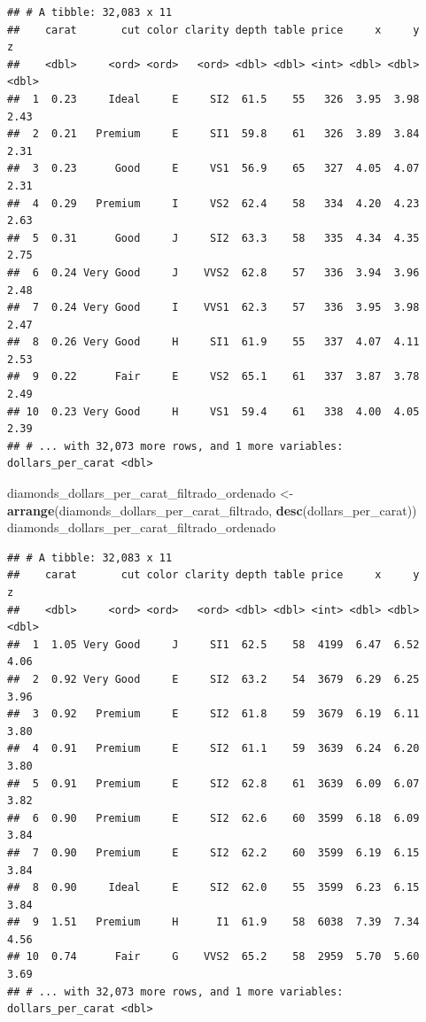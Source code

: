 \documentclass[]{book}
\newenvironment{Shaded}{\begin{snugshade}}{\end{snugshade}}
\newcommand{\KeywordTok}[1]{\textcolor[rgb]{0.13,0.29,0.53}{\textbf{#1}}}
\newcommand{\StringTok}[1]{\textcolor[rgb]{0.31,0.60,0.02}{#1}}
\newcommand{\NormalTok}[1]{#1}
\theoremstyle{definition}
\theoremstyle{definition}
\theoremstyle{definition}
\theoremstyle{remark}
\begin{document}
\begin{verbatim}
## # A tibble: 32,083 x 11
##    carat       cut color clarity depth table price     x     y     z
##    <dbl>     <ord> <ord>   <ord> <dbl> <dbl> <int> <dbl> <dbl> <dbl>
##  1  0.23     Ideal     E     SI2  61.5    55   326  3.95  3.98  2.43
##  2  0.21   Premium     E     SI1  59.8    61   326  3.89  3.84  2.31
##  3  0.23      Good     E     VS1  56.9    65   327  4.05  4.07  2.31
##  4  0.29   Premium     I     VS2  62.4    58   334  4.20  4.23  2.63
##  5  0.31      Good     J     SI2  63.3    58   335  4.34  4.35  2.75
##  6  0.24 Very Good     J    VVS2  62.8    57   336  3.94  3.96  2.48
##  7  0.24 Very Good     I    VVS1  62.3    57   336  3.95  3.98  2.47
##  8  0.26 Very Good     H     SI1  61.9    55   337  4.07  4.11  2.53
##  9  0.22      Fair     E     VS2  65.1    61   337  3.87  3.78  2.49
## 10  0.23 Very Good     H     VS1  59.4    61   338  4.00  4.05  2.39
## # ... with 32,073 more rows, and 1 more variables: dollars_per_carat <dbl>
\end{verbatim}

\begin{Shaded}
\begin{Highlighting}[]
\NormalTok{diamonds_dollars_per_carat_filtrado_ordenado <-}\StringTok{ }\KeywordTok{arrange}\NormalTok{(diamonds_dollars_per_carat_filtrado, }\KeywordTok{desc}\NormalTok{(dollars_per_carat))}
\NormalTok{diamonds_dollars_per_carat_filtrado_ordenado}
\end{Highlighting}
\end{Shaded}

\begin{verbatim}
## # A tibble: 32,083 x 11
##    carat       cut color clarity depth table price     x     y     z
##    <dbl>     <ord> <ord>   <ord> <dbl> <dbl> <int> <dbl> <dbl> <dbl>
##  1  1.05 Very Good     J     SI1  62.5    58  4199  6.47  6.52  4.06
##  2  0.92 Very Good     E     SI2  63.2    54  3679  6.29  6.25  3.96
##  3  0.92   Premium     E     SI2  61.8    59  3679  6.19  6.11  3.80
##  4  0.91   Premium     E     SI2  61.1    59  3639  6.24  6.20  3.80
##  5  0.91   Premium     E     SI2  62.8    61  3639  6.09  6.07  3.82
##  6  0.90   Premium     E     SI2  62.6    60  3599  6.18  6.09  3.84
##  7  0.90   Premium     E     SI2  62.2    60  3599  6.19  6.15  3.84
##  8  0.90     Ideal     E     SI2  62.0    55  3599  6.23  6.15  3.84
##  9  1.51   Premium     H      I1  61.9    58  6038  7.39  7.34  4.56
## 10  0.74      Fair     G    VVS2  65.2    58  2959  5.70  5.60  3.69
## # ... with 32,073 more rows, and 1 more variables: dollars_per_carat <dbl>
\end{verbatim}
\end{document}
